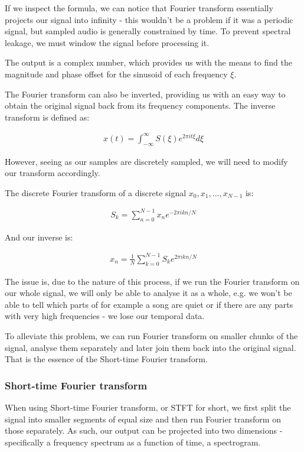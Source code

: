 If we inspect the formula, we can notice that Fourier transform essentially projects our signal into infinity - this wouldn't be a problem if it was a periodic signal, but sampled audio is generally constrained by time. To prevent spectral leakage, we must window the signal before processing it. \cite{heinzel_2002_windows}

The output is a complex number, which provides us with the means to find the magnitude and phase offset for the sinusoid of each frequency $\xi$.

The Fourier transform can also be inverted, providing us with an easy way to obtain the original signal back from its frequency components. The inverse transform is defined as:

\begin{align}
x(t) = \int_{-\infty}^{\infty}S(\xi)e^{2\pi it\xi}d\xi
\end{align}

However, seeing as our samples are discretely sampled, we will need to modify our transform accordingly.

The discrete Fourier transform of a discrete signal $x_0, x_1, ..., x_{N-1}$ is: \cite{Recoskie2014ConstrainedNM}

\begin{align}
S_k = \sum_{n=0}^{N-1}x_ne^{-2\pi ikn/N}
\end{align}

And our inverse is:

\begin{align}
x_n = \frac1N \sum_{k=0}^{N-1}S_ke^{2\pi ikn/N}
\end{align}

The issue is, due to the nature of this process, if we run the Fourier transform on our whole signal, we will only be able to analyse it as a whole, e.g. we won't be able to tell which parts of for example a song are quiet or if there are any parts with very high frequencies - we lose our temporal data.

To alleviate this problem, we can run Fourier transform on smaller chunks of the signal, analyse them separately and later join them back into the original signal. That is the essence of the Short-time Fourier transform.

\subsubsection{Short-time Fourier transform}
When using Short-time Fourier transform, or STFT for short, we first split the signal into smaller segments of equal size and then run Fourier transform on those separately. As such, our output can be projected into two dimensions - specifically a frequency spectrum as a function of time, a spectrogram.

